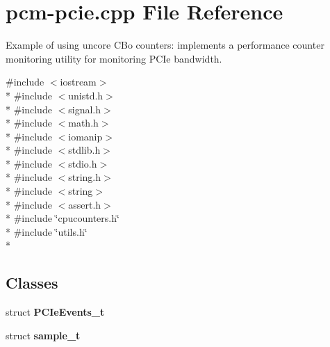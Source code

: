 \section{pcm-\/pcie.cpp File Reference}
\label{pcm-pcie_8cpp}


Example of using uncore C\+Bo counters\+: implements a performance counter monitoring utility for monitoring P\+C\+Ie bandwidth.  


{\ttfamily \#include $<$iostream$>$}\\*
{\ttfamily \#include $<$unistd.\+h$>$}\\*
{\ttfamily \#include $<$signal.\+h$>$}\\*
{\ttfamily \#include $<$math.\+h$>$}\\*
{\ttfamily \#include $<$iomanip$>$}\\*
{\ttfamily \#include $<$stdlib.\+h$>$}\\*
{\ttfamily \#include $<$stdio.\+h$>$}\\*
{\ttfamily \#include $<$string.\+h$>$}\\*
{\ttfamily \#include $<$string$>$}\\*
{\ttfamily \#include $<$assert.\+h$>$}\\*
{\ttfamily \#include \char`\"{}cpucounters.\+h\char`\"{}}\\*
{\ttfamily \#include \char`\"{}utils.\+h\char`\"{}}\\*
\subsection*{Classes}
\begin{DoxyCompactItemize}
\item 
struct {\bf P\+C\+Ie\+Events\+\_\+t}
\item 
struct {\bf sample\+\_\+t}
\end{DoxyCompactItemize}
